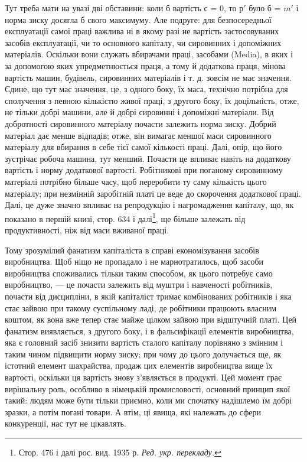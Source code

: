 Тут треба мати на увазі дві обставини: коли б вартість $с$ = 0,
то $р'$ було б = $m'$ і норма зиску досягла б свого максимуму.
Але подруге: для безпосередньої експлуатації самої праці важлива
ні в якому разі не вартість застосовуваних засобів експлуатації,
чи то основного капіталу, чи сировинних і допоміжних
матеріалів. Оскільки вони служать вбирачами праці, засобами
(Media), в яких і за допомогою яких упредметнюється праця,
а тому й додаткова праця, мінова вартість машин, будівель,
сировинних матеріалів і т. д. зовсім не має значення. Єдине, що
тут має значення, це, з одного боку, їх маса, технічно потрібна
для сполучення з певною кількістю живої праці, з другого боку,
їх доцільність, отже, не тільки добрі машини, але й добрі сировинні
і допоміжні матеріали. Від добротності сировинного матеріалу
почасти залежить норма зиску. Добрий матеріал дає менше
відпадів; отже, він вимагає меншої маси сировинного матеріалу
для вбирання в себе тієї самої кількості праці. Далі, опір, що
його зустрічає робоча машина, тут менший. Почасти це впливає
навіть на додаткову вартість і норму додаткової вартості. Робітникові
при поганому сировинному матеріалі потрібно більше
часу, щоб переробити ту саму кількість цього матеріалу; при
незмінній заробітній платі це веде до скорочення додаткової
праці. Далі, це дуже значно впливає на репродукцію і нагромадження
капіталу, що, як показано в першій книзі, стор. 634
і далі\footnote*{
Стор. 476 і далі рос. вид. 1935 р. \emph{Ред. укр. перекладу.}
}, ще більше залежать від продуктивності, ніж від маси вживаної
праці.

Тому зрозумілий фанатизм капіталіста в справі економізування
засобів виробництва. Щоб ніщо не пропадало і не марнотратилось,
щоб засоби виробництва споживались тільки таким
способом, як цього потребує само виробництво, — це почасти
залежить від муштри і навченості робітників, почасти від дисципліни,
в якій капіталіст тримає комбінованих робітників і яка стає
зайвою при такому суспільному ладі, де робітники працюють
власним коштом, як вона вже тепер стає майже цілком зайвою
при відштучній платі. Цей фанатизм виявляється, з другого боку,
і в фальсифікації елементів виробництва, яка є головний засіб
знизити вартість сталого капіталу порівняно з змінним і таким
чином підвищити норму зиску; при чому до цього долучається
ще, як істотний елемент шахрайства, продаж цих елементів
виробництва вище їх вартості, оскільки ця вартість знову з’являється
в продукті. Цей момент грає вирішальну роль, особливо
в німецькій промисловості, основний принцип якої такий: людям
може бути тільки приємно, коли ми спочатку надішлемо їм добрі
зразки, а потім погані товари. А втім, ці явища, які належать до
сфери конкуренції, нас тут не цікавлять.

